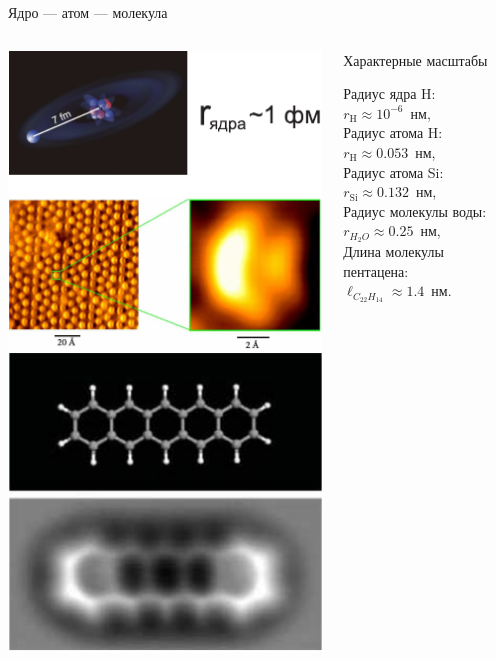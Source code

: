 \documentclass[9pt, compress, xcolor=table]{beamer}
\begin{document}
\begin{frame}{Ядро --- атом --- молекула}

\begin{columns}[c]

\column{1.6in}

\begin{center}
\includegraphics[scale=0.7]{Nucleus-atom-molecula}
\end{center}

\column{2.2in}

\begin{block}{Характерные масштабы}

Радиус ядра H: \\
$r_{\text{H}}\approx10^{-6}$~нм, \\
Радиус атома H: \\
$r_{\text{H}}\approx0.053$~нм, \\
Радиус атома Si: \\
$r_{\text{Si}}\approx0.132$~нм, \\
Радиус молекулы воды: \\
$r_{H_2O}\approx0.25$~нм, \\
Длина молекулы пентацена: \\
$\ell_{C_{22}H_{14}}\approx1.4$~нм.
\end{block}

\end{columns}

\end{frame}
\end{document}
